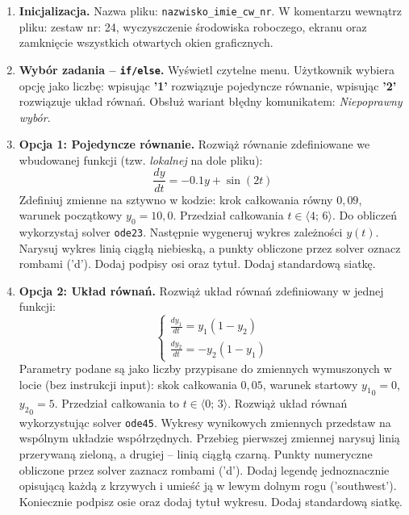 \documentclass[a4paper,11pt]{article}
\begin{document}
\begin{enumerate}[leftmargin=*, label=\textbf{\arabic*.}, itemsep=2pt]

  \item \textbf{Inicjalizacja.}
    Nazwa pliku: \texttt{nazwisko\_imie\_cw\_nr}. W komentarzu wewnątrz pliku: zestaw nr: 24, wyczyszczenie środowiska roboczego, ekranu oraz zamknięcie wszystkich otwartych okien graficznych.

  \item \textbf{Wybór zadania -- \texttt{if/else}.}
    Wyświetl czytelne menu. Użytkownik wybiera opcję jako liczbę: wpisując \textbf{'1'} rozwiązuje pojedyncze równanie, wpisując \textbf{'2'} rozwiązuje układ równań. Obsłuż wariant błędny komunikatem: \textit{Niepoprawny wybór}.

  \item \textbf{Opcja 1: Pojedyncze równanie.}
    Rozwiąż równanie zdefiniowane we wbudowanej funkcji (tzw. \textit{lokalnej} na dole pliku):
    \[ \frac{dy}{dt} = -0.1y + \sin(2t) \]
    Zdefiniuj zmienne na sztywno w kodzie: krok całkowania równy $0{,}09$, warunek początkowy $y_0 = 10{,}0$. Przedział całkowania $t \in \langle 4;\,6 \rangle$.
    Do obliczeń wykorzystaj solver \texttt{ode23}. Następnie wygeneruj wykres zależności $y(t)$. Narysuj wykres linią ciągłą niebieską, a punkty obliczone przez solver oznacz rombami ('d'). Dodaj podpisy osi oraz tytuł. Dodaj standardową siatkę.

  \item \textbf{Opcja 2: Układ równań.}
    Rozwiąż układ równań zdefiniowany w jednej funkcji:\\[-0.5em]
    \[
    \begin{cases}
      \frac{dy_1}{dt} = y_1(1 - y_2) \\
      \frac{dy_2}{dt} = -y_2(1 - y_1)
    \end{cases}
    \]
    Parametry podane są jako liczby przypisane do zmiennych wymuszonych w locie (bez instrukcji input): skok całkowania $0{,}05$, warunek startowy $ {y_1}_{0} = 0 $, $ {y_2}_{0} = 5 $. Przedział całkowania to $t \in \langle 0;\,3 \rangle$.
    Rozwiąż układ równań wykorzystując solver \texttt{ode45}. Wykresy wynikowych zmiennych przedstaw na wspólnym układzie współrzędnych. Przebieg pierwszej zmiennej narysuj linią przerywaną zieloną, a drugiej -- linią ciągłą czarną. Punkty numeryczne obliczone przez solver zaznacz rombami ('d'). Dodaj legendę jednoznacznie opisującą każdą z krzywych i umieść ją w lewym dolnym rogu ('southwest'). Koniecznie podpisz osie oraz dodaj tytuł wykresu. Dodaj standardową siatkę.

\end{enumerate}
\end{document}
